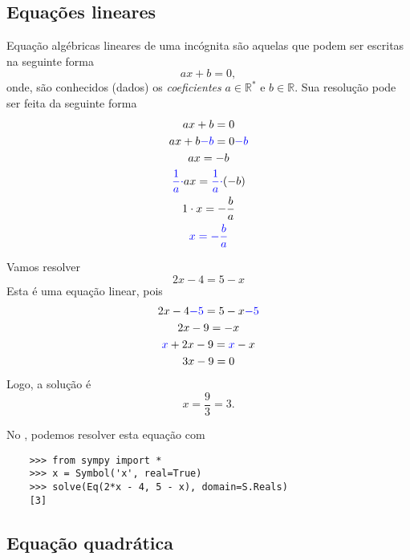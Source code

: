 \subsection{Equações lineares}

Equação algébricas lineares de uma incógnita são aquelas que podem ser escritas na seguinte forma
\begin{equation}
  ax + b = 0,
\end{equation}
onde, são conhecidos (dados) os \emph{coeficientes} $a\in\mathbb{R}^*$ e $b\in\mathbb{R}$. Sua resolução pode ser feita da seguinte forma
\begin{gather}
  ax + b = 0 \\
  ax + b {\color{blue}- b} = 0 {\color{blue}- b} \\
  ax = -b \\
  {\color{blue}\frac{1}{a}\cdot}ax = {\color{blue}\frac{1}{a}\cdot}(-b) \\
  1\cdot x = -\frac{b}{a} \\
  {\color{blue}x = -\frac{b}{a}}
\end{gather}

\begin{ex}
  Vamos resolver
  \begin{equation}
    2x -4 = 5 - x
  \end{equation}
  Esta é uma equação linear, pois
  \begin{gather}
    2x - 4 {\color{blue}- 5} = 5 - x {\color{blue}- 5} \\
    2x -9 = -x \\
    {\color{blue}x} + 2x - 9 = {\color{blue}x} - x \\
    3x - 9 = 0\\
  \end{gather}
  Logo, a solução é
  \begin{equation}
    x = \frac{9}{3} = 3.
  \end{equation}

  \ifispython
  No \python, podemos resolver esta equação com
  \begin{lstlisting}
    >>> from sympy import *
    >>> x = Symbol('x', real=True)
    >>> solve(Eq(2*x - 4, 5 - x), domain=S.Reals)
    [3]
  \end{lstlisting}
  \fi
\end{ex}

\subsection{Equação quadrática}

